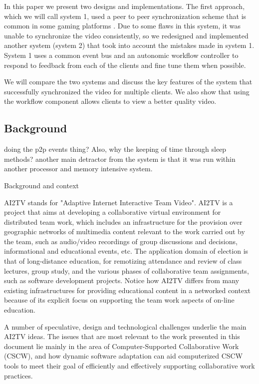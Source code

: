 \documentclass[12pt]{article}
\begin{document}
In this paper we present two designs and implementations.  The first
approach, which we will call system 1, used a peer to peer
synchronization scheme that is common in some gaming platforms
\cite{findme}.  Due to some flaws in this system, it was unable to
synchronize the video consistently, so we redesigned and implemented
another system (system 2) that took into account the mistakes made in
system 1.  System 1 uses a common event bus and an autonomic workflow
controller to respond to feedback from each of the clients and fine
tune them when possible.

We will compare the two systems and discuss the key features of the
system that successfully synchronized the video for multiple clients.
We also show that using the workflow component allows clients to view
a better quality video.

\subsection{Background} 

doing the p2p events thing?
Also, why the keeping of time through sleep methods?  another
main detractor from the system is that it was run within another
processor and memory intensive system.  


Background and context

AI2TV stands for "Adaptive Internet Interactive Team Video". AI2TV is
a project that aims at developing a collaborative virtual environment
for distributed team work, which includes an infrastructure for the
provision over geographic networks of multimedia content relevant to
the work carried out by the team, such as audio/video recordings of
group discussions and decisions, informational and educational events,
etc. The application domain of election is that of long-distance
education, for remotizing attendance and review of class lectures,
group study, and the various phases of collaborative team assignments,
such as software development projects. Notice how AI2TV differs from
many existing infrastructures for providing educational content in a
networked context because of its explicit focus on supporting the team
work aspects of on-line education.

A number of speculative, design and technological challenges underlie
the main AI2TV ideas. The issues that are most relevant to the work
presented in this document lie mainly in the area of
Computer-Supported Collaborative Work (CSCW), and how dynamic software
adaptation can aid computerized CSCW tools to meet their goal of
efficiently and effectively supporting collaborative work practices.
\end{document}
